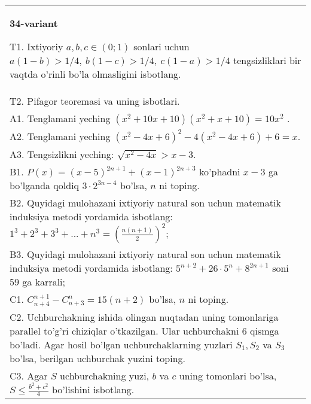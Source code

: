 \documentclass{article}
\begin{document}
\begin{tabular}{m{17cm}}
\textbf{34-variant}
\newline

T1. Ixtiyoriy \(a,b,c \in (0;1)\) sonlari uchun \(a(1 - b) > 1/4,\ b(1 - c) > 1/4,\ c(1 - a) > 1/4\) tengsizliklari bir vaqtda o'rinli bo'la olmasligini isbotlang. \\
T2. Pifagor teoremasi va uning isbotlari. \\
A1. Tenglamani yeching \(\left( x^{2} + 10x + 10 \right)\left( x^{2} + x + 10 \right) = 10x^{2}\) . \\
A2. Tenglamani yeching \(\left( x^{2} - 4x + 6 \right)^{2} - 4\left( x^{2} - 4x + 6 \right) + 6 = x\). \\
A3. Tengsizlikni yeching: \(\sqrt{x^{2} - 4x} > x - 3\). \\
B1. \(P(x) = (x - 5)^{2n + 1} + (x - 1)^{2n + 3}\) ko'phadni \(x - 3\) ga bo'lganda qoldiq \(3 \cdot 2^{3n - 4}\) bo'lsa, \(n\) ni toping. \\
B2. Quyidagi mulohazani ixtiyoriy natural son uchun matematik induksiya metodi yordamida isbotlang: \(1^{3} + 2^{3} + 3^{3} + ... + n^{3} = \left( \frac{n(n + 1)}{2} \right)^{2}\); \\
B3. Quyidagi mulohazani ixtiyoriy natural son uchun matematik induksiya metodi yordamida isbotlang: \(5^{n + 2} + 26 \cdot 5^{n} + 8^{2n + 1}\) soni 59 ga karrali; \\
C1. \(C_{n + 4}^{n + 1} - C_{n + 3}^{n} = 15(n + 2)\) bo'lsa, \(n\) ni toping. \\
C2. Uchburchakning ishida olingan nuqtadan uning tomonlariga parallel to'g'ri chiziqlar o'tkazilgan. Ular uchburchakni 6 qismga bo'ladi. Agar hosil bo'lgan uchburchaklarning yuzlari \(S_{1},S_{2}\) va \(S_{3}\) bo'lsa, berilgan uchburchak yuzini toping. \\
C3. Agar \(S\) uchburchakning yuzi, \(b\) va \(c\) uning tomonlari bo'lsa, \(S \leq \frac{b^{2} + c^{2}}{4}\) bo'lishini isbotlang. \\

\end{tabular}
\vspace{1cm}
\end{document}
